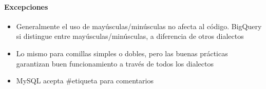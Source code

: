 \paragraph{Excepciones}
\begin{itemize}
    \item {Generalmente el uso de mayúsculas/minúsculas no afecta al código. BigQuery si distingue entre mayúsculas/minúsculas, a diferencia de otros dialectos}
    \item {Lo mismo para comillas simples o dobles, pero las buenas prácticas garantizan buen funcionamiento a través de todos los dialectos}
    \item {MySQL acepta \#etiqueta para comentarios}
\end{itemize}